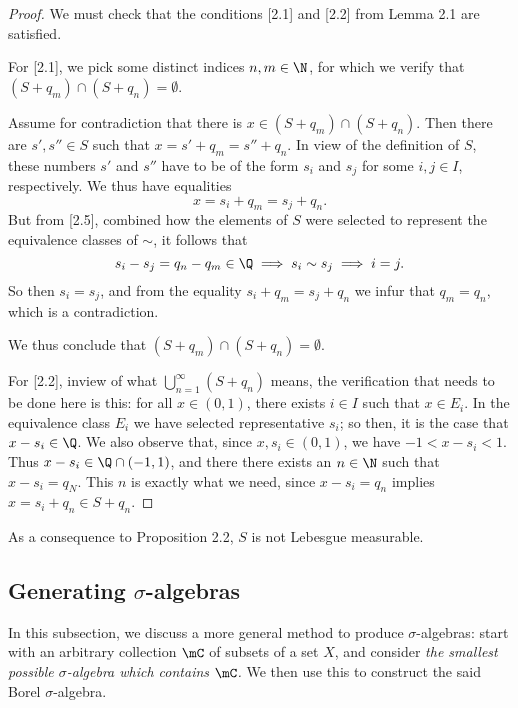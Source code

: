\documentclass[pmath450]{subfiles}
\begin{document}
    \begin{proof}
        We must check that the conditions [2.1] and [2.2] from Lemma 2.1 are satisfied.

        For [2.1], we pick some distinct indices $n,m\in\N$, for which we verify that $\left( S+q_m \right)\cap\left( S+q_n \right)=\emptyset$.

        Assume for contradiction that there is $x\in\left( S+q_m \right)\cap\left( S+q_n \right)$. Then there are $s',s''\in S$ such that $x=s'+q_m=s''+q_n$. In view of the definition of $S$, these numbers $s'$ and $s''$ have to be of the form $s_i$ and $s_j$ for some $i,j\in I$, respectively. We thus have equalities
        \begin{equation}
            x = s_i+q_m = s_j+q_n.
        \end{equation}
        But from [2.5], combined how the elements of $S$ were selected to represent the equivalence classes of $\sim$, it follows that
        \begin{equation*}
            s_i-s_j = q_n-q_m \in\Q\implies s_i\sim s_j\implies i=j.
        \end{equation*}
        So then $s_i=s_j$, and from the equality $s_i+q_m=s_j+q_n$ we infur that $q_m=q_n$, which is a contradiction.

        We thus conclude that $\left( S+q_m \right)\cap\left( S+q_n \right)=\emptyset$.

        For [2.2], inview of what $\bigcup^{\infty}_{n=1}\left( S+q_n \right)$ means, the verification that needs to be done here is this: for all $x\in\left( 0,1 \right)$, there exists $i\in I$ such that $x\in E_i$. In the equivalence class $E_i$ we have selected representative $s_i$; so then, it is the case that $x-s_i\in\Q$. We also observe that, since $x,s_i\in\left( 0,1 \right)$, we have $-1<x-s_i<1$. Thus $x-s_i\in\Q\cap\left( -1,1 \right)$, and there there exists an $n\in\N$ such that $x-s_i=q_N$. This $n$ is exactly what we need, since $x-s_i=q_n$ implies $x=s_i+q_n\in S+q_n$.
    \end{proof}

    \np As a consequence to Proposition 2.2, $S$ is not Lebesgue measurable.

    \subsection{Generating $\sigma$-algebras}
    
    In this subsection, we discuss a more general method to produce $\sigma$-algebras: start with an arbitrary collection $\mC$ of subsets of a set $X$, and consider \textit{the smallest possible $\sigma$-algebra which contains $\mC$.} We then use this to construct the said Borel $\sigma$-algebra.
\end{document}
